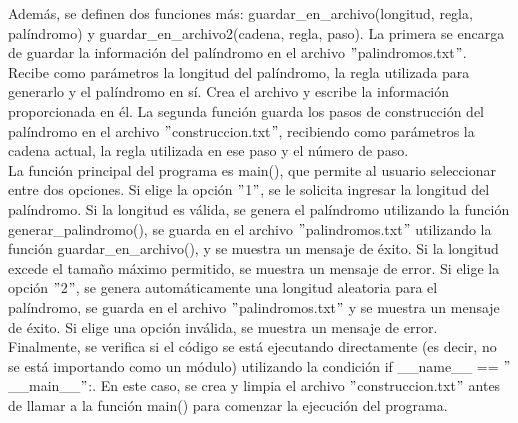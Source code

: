 Además, se definen dos funciones más: guardar\_en\_archivo(longitud, regla, palíndromo) y guardar\_en\_archivo2(cadena, regla, paso). La primera se encarga de guardar la información del palíndromo en el archivo $"$palindromos.txt$"$. Recibe como parámetros la longitud del palíndromo, la regla utilizada para generarlo y el palíndromo en sí. Crea el archivo y escribe la información proporcionada en él. La segunda función guarda los pasos de construcción del palíndromo en el archivo $"$construccion.txt$"$, recibiendo como parámetros la cadena actual, la regla utilizada en ese paso y el número de paso.\newline
\\

La función principal del programa es main(), que permite al usuario seleccionar entre dos opciones. Si elige la opción $"$1$"$, se le solicita ingresar la longitud del palíndromo. Si la longitud es válida, se genera el palíndromo utilizando la función generar\_palindromo(), se guarda en el archivo $"$palindromos.txt$"$ utilizando la función guardar\_en\_archivo(), y se muestra un mensaje de éxito. Si la longitud excede el tamaño máximo permitido, se muestra un mensaje de error. Si elige la opción $"$2$"$, se genera automáticamente una longitud aleatoria para el palíndromo, se guarda en el archivo $"$palindromos.txt$"$ y se muestra un mensaje de éxito. Si elige una opción inválida, se muestra un mensaje de error.\newline
\\

Finalmente, se verifica si el código se está ejecutando directamente (es decir, no se está importando como un módulo) utilizando la condición if \_\_name\_\_ == $"$\_\_main\_\_$"$:. En este caso, se crea y limpia el archivo $"$construccion.txt$"$ antes de llamar a la función main() para comenzar la ejecución del programa.

